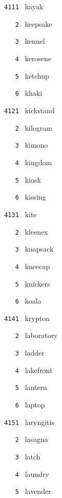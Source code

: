 \documentclass[11pt]{article}
\begin{document}
\begin{multicols}{6}
\footnotesize
\noindent \texttt{ 4111 } kayak  \par
\noindent \texttt{ \ \ \ 2 } keepsake  \par
\noindent \texttt{ \ \ \ 3 } kennel  \par
\noindent \texttt{ \ \ \ 4 } kerosene  \par
\noindent \texttt{ \ \ \ 5 } ketchup  \par
\noindent \texttt{ \ \ \ 6 } khaki  \par
\vspace{3mm}
\noindent \texttt{ 4121 } kickstand  \par
\noindent \texttt{ \ \ \ 2 } kilogram  \par
\noindent \texttt{ \ \ \ 3 } kimono  \par
\noindent \texttt{ \ \ \ 4 } kingdom  \par
\noindent \texttt{ \ \ \ 5 } kiosk  \par
\noindent \texttt{ \ \ \ 6 } kissing  \par
\vspace{3mm}
\noindent \texttt{ 4131 } kite  \par
\noindent \texttt{ \ \ \ 2 } kleenex  \par
\noindent \texttt{ \ \ \ 3 } knapsack  \par
\noindent \texttt{ \ \ \ 4 } kneecap  \par
\noindent \texttt{ \ \ \ 5 } knickers  \par
\noindent \texttt{ \ \ \ 6 } koala  \par
\vspace{3mm}
\noindent \texttt{ 4141 } krypton  \par
\noindent \texttt{ \ \ \ 2 } laboratory  \par
\noindent \texttt{ \ \ \ 3 } ladder  \par
\noindent \texttt{ \ \ \ 4 } lakefront  \par
\noindent \texttt{ \ \ \ 5 } lantern  \par
\noindent \texttt{ \ \ \ 6 } laptop  \par
\vspace{3mm}
\noindent \texttt{ 4151 } laryngitis  \par
\noindent \texttt{ \ \ \ 2 } lasagna  \par
\noindent \texttt{ \ \ \ 3 } latch  \par
\noindent \texttt{ \ \ \ 4 } laundry  \par
\noindent \texttt{ \ \ \ 5 } lavender  \par

\end{multicols}
\end{document}
